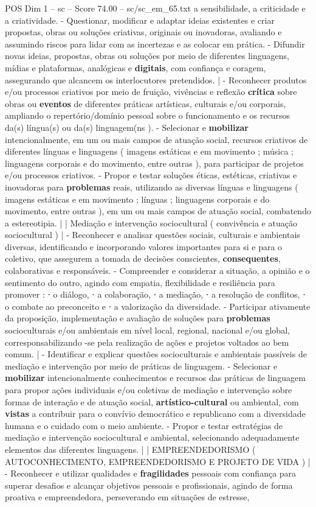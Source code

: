 \begin{textsample}{POS Dim 1 – sc – Score 74.00 – sc/sc\_em\_65.txt}
a sensibilidade, a criticidade e a criatividade. - Questionar, modificar e adaptar ideias existentes e criar propostas, obras ou soluções criativas, originais ou inovadoras, avaliando e assumindo riscos para lidar com as incertezas e as colocar em prática. - Difundir novas ideias, propostas, obras ou soluções por meio de diferentes linguagens, mídias e plataformas, analógicas e \textbf{digitais}, com confiança e coragem, assegurando que alcancem os interlocutores pretendidos. | - Reconhecer produtos e/ou processos criativos por meio de fruição, vivências e reflexão \textbf{crítica} sobre obras ou \textbf{eventos} de diferentes práticas artísticas, culturais e/ou corporais, ampliando o repertório/domínio pessoal sobre o funcionamento e os recursos da(s) língua(s) ou da(s) linguagem(ns ). - Selecionar e \textbf{mobilizar} intencionalmente, em um ou mais campos de atuação social, recursos criativos de diferentes línguas e linguagens ( imagens estáticas e em movimento ; música ; linguagens corporais e do movimento, entre outras ), para participar de projetos e/ou processos criativos. - Propor e testar soluções éticas, estéticas, criativas e inovadoras para \textbf{problemas} reais, utilizando as diversas línguas e linguagens ( imagens estáticas e em movimento ; línguas ; linguagens corporais e do movimento, entre outras ), em um ou mais campos de atuação social, combatendo a estereotipia. | | Mediação e intervenção sociocultural ( convivência e atuação sociocultural ) | - Reconhecer e analisar questões sociais, culturais e ambientais diversas, identificando e incorporando valores importantes para si e para o coletivo, que assegurem a tomada de decisões conscientes, \textbf{consequentes}, colaborativas e responsáveis. - Compreender e considerar a situação, a opinião e o sentimento do outro, agindo com empatia, flexibilidade e resiliência para promover : ⋅ o diálogo, ⋅ a colaboração, ⋅ a mediação, ⋅ a resolução de conflitos, ⋅ o combate ao preconceito e ⋅ a valorização da diversidade. - Participar ativamente da proposição, implementação e avaliação de soluções para \textbf{problemas} socioculturais e/ou ambientais em nível local, regional, nacional e/ou global, corresponsabilizando -se pela realização de ações e projetos voltados ao bem comum. | - Identificar e explicar questões socioculturais e ambientais passíveis de mediação e intervenção por meio de práticas de linguagem. - Selecionar e \textbf{mobilizar} intencionalmente conhecimentos e recursos das práticas de linguagem para propor ações individuais e/ou coletivas de mediação e intervenção sobre formas de interação e de atuação social, \textbf{artístico-cultural} ou ambiental, com \textbf{vistas} a contribuir para o convívio democrático e republicano com a diversidade humana e o cuidado com o meio ambiente. - Propor e testar estratégias de mediação e intervenção sociocultural e ambiental, selecionando adequadamente elementos das diferentes linguagens. | | EMPREENDEDORISMO ( AUTOCONHECIMENTO, EMPREENDEDORISMO E PROJETO DE VIDA ) | - Reconhecer e utilizar qualidades e \textbf{fragilidades} pessoais com confiança para superar desafios e alcançar objetivos pessoais e profissionais, agindo de forma proativa e empreendedora, perseverando em situações de estresse, 
\end{textsample}

